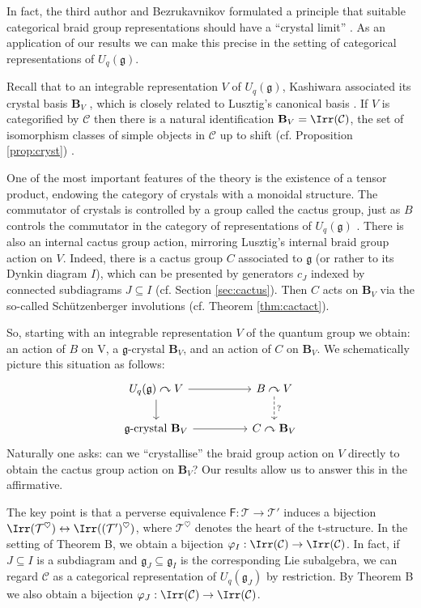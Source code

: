 \documentclass[11pt,reqno]{amsart}
\numberwithin{equation}{section}
\theoremstyle{definition}
\theoremstyle{named}
\newcommand{\bB}{\mathbf{B}}
\newcommand{\cC}{\mathcal{C}}
\newcommand{\sF}{\mathsf{F}}
\newcommand{\cT}{\mathcal{T}}
\newcommand{\fg}{\mathfrak{g}}
\begin{document}
In fact, the third author and Bezrukavnikov formulated a principle that suitable categorical braid group representations should have a ``crystal limit'' \cite[Section 9]{BLet}.  As an application of our results we can make this precise in the setting of categorical representations of $U_q(\fg)$.

Recall that to an integrable representation $V$ of $U_q(\fg)$, Kashiwara associated its crystal basis $\bB_V$ \cite{Kash90}, which is closely related to Lusztig's canonical basis \cite{GL92}.  If $V$ is categorified by $\cC$ then there is a natural identification $\bB_V=\Irr(\cC)$, the set of isomorphism classes of simple objects in $\cC$ up to shift (cf. Proposition \ref{prop:cryst})	.

One of the most important features of the theory is the existence of a tensor product, endowing the category of crystals with a monoidal structure. The commutator of crystals is controlled by a group called the cactus group, just as $B$ controls the commutator in the category of representations of $U_q(\fg)$ \cite{HK06}.  There is also an internal cactus group action, mirroring Lusztig's internal braid group action on $V$.  Indeed, there is a cactus group $C$ associated to $\fg$ (or rather to its Dynkin diagram $I$), which can be presented by generators $c_J$ indexed by connected subdiagrams $J \subseteq I$ (cf. Section \ref{sec:cactus}).  Then $C$ acts on $\bB_V$ via the so-called Sch\"utzenberger involutions (cf. Theorem \ref{thm:cactact}).  

So, starting with an integrable representation $V$ of the quantum group we obtain:
an action of $B$ on V,
a $\fg$-crystal $\bB_V$, and
an action of $C$ on $\bB_V$.
We schematically picture this situation as follows:
\[
\begin{tikzcd}
U_q(\fg) \curvearrowright V  \ar[rr]  \ar[d] &  & B \curvearrowright V  \arrow[d, dashed,"?"] \\
\fg\text{-crystal } \bB_V \ar[rr]            &  & C       \curvearrowright    \bB_V        
\end{tikzcd}
\]
Naturally one asks: can we ``crystallise'' the braid group action on $V$ directly to obtain the cactus group action on $\bB_V$?  Our results allow us to answer this in the affirmative.    

The key point is that a perverse equivalence $\sF:\cT \to \cT'$ induces a bijection $\Irr(\cT^\heartsuit) \leftrightarrow \Irr((\cT')^\heartsuit)$, where $\cT^\heartsuit$ denotes the heart of the t-structure. In the setting of Theorem B, we obtain a bijection $\varphi_I:\Irr(\cC) \to \Irr(\cC)$.  In fact, if $J\subseteq I$ is a subdiagram and $\fg_J \subseteq \fg_I$ is the corresponding Lie subalgebra, we can regard $\cC$ as a categorical representation of $U_q(\fg_J)$ by restriction.  By Theorem B we also obtain a bijection $\varphi_J:\Irr(\cC) \to \Irr(\cC)$.
\end{document}
